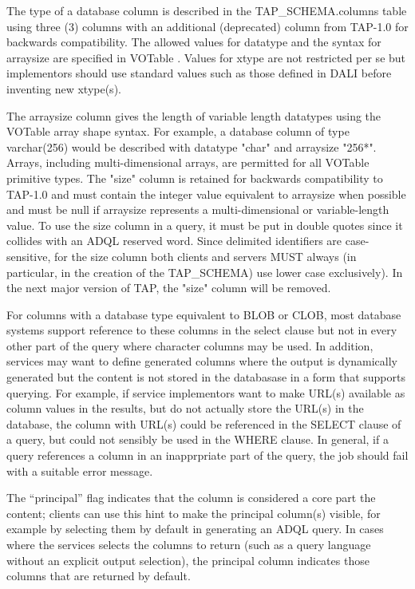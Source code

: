 \documentclass[11pt,letter]{ivoa}
\begin{document}
The type of a database column is described in the TAP\_SCHEMA.columns
table using three (3) columns with an additional (deprecated) column from TAP-1.0 
for backwards compatibility. The allowed values for datatype and the syntax for arraysize
are specified in VOTable \citep{std:VOTable}. Values for xtype are not restricted per se but 
implementors should use standard values such as those defined in DALI \citep{std:DALI} before 
inventing new xtype(s). 

The arraysize column gives the length of variable length datatypes using the VOTable
array shape syntax. For example, a database column of type varchar(256) would be 
described with datatype "char" and arraysize "256*". Arrays, including multi-dimensional 
arrays, are permitted for all VOTable primitive types. The "size" column is retained for backwards
compatibility to TAP-1.0 and must contain the integer value equivalent to arraysize when 
possible and must be null if arraysize represents a multi-dimensional or variable-length value.
To use the size column in a query, it must be put in double quotes since it collides with an ADQL reserved word. Since delimited identifiers are case-sensitive, for the size column both
clients and servers MUST always (in particular, in the creation of the 
TAP\_SCHEMA) use lower case exclusively). In the next major version 
of TAP, the "size" column will be removed.

For columns with a database type equivalent to BLOB or CLOB, most database systems support
reference to these columns in the select clause but not in every other part of the query where
character columns may be used. In addition, services may want to define generated columns where the output is dynamically generated but the content is not stored in the 
databasase in a form that supports querying. For example, if service implementors want to make
URL(s) available as column values in the results, but do not actually store the URL(s) in the
database, the column with URL(s) could be referenced in the SELECT clause of a query, but could
not sensibly be used in the WHERE clause. In general, if a query references a column in an 
inapprpriate part of the query, the job should fail with a suitable error message.

The “principal” flag indicates that the column is considered a core part the 
content; clients can use this hint to make the principal column(s) visible, for 
example by selecting them by default in generating an ADQL query. In cases where 
the services selects the columns to return (such as a query language without an 
explicit output selection), the principal column indicates those columns that 
are returned by default. 
\end{document}
